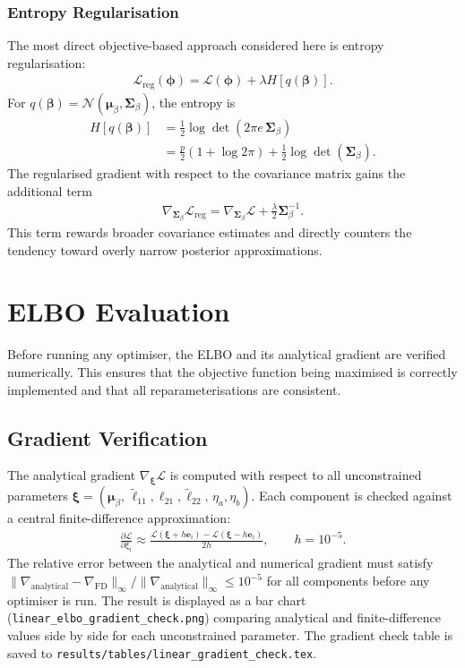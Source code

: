 \documentclass[11pt,a4paper]{article}
\newcommand{\N}{\mathcal{N}}
\begin{document}
\subsubsection{Entropy Regularisation}

The most direct objective-based approach considered here is entropy regularisation:
\begin{align}
\mathcal{L}_{\mathrm{reg}}(\bm{\phi})
= \mathcal{L}(\bm{\phi}) + \lambda H[q(\bm{\beta})].
\end{align}
For $q(\bm{\beta})=\N(\bm{\mu}_\beta,\bm{\Sigma}_\beta)$, the entropy is
\begin{align}
H[q(\bm{\beta})]
&= \frac{1}{2}\log\det(2\pi e\,\bm{\Sigma}_\beta)\\
&= \frac{p}{2}(1+\log 2\pi) + \frac{1}{2}\log\det(\bm{\Sigma}_\beta).
\end{align}
The regularised gradient with respect to the covariance matrix gains the additional term
\begin{align}
\nabla_{\bm{\Sigma}_\beta}\mathcal{L}_{\mathrm{reg}}
= \nabla_{\bm{\Sigma}_\beta}\mathcal{L}
+ \frac{\lambda}{2}\bm{\Sigma}_\beta^{-1}.
\end{align}
This term rewards broader covariance estimates and directly counters the tendency toward overly narrow posterior approximations.
\section{ELBO Evaluation}
\label{sec:elbo-evaluation}

Before running any optimiser, the ELBO and its analytical gradient are verified numerically.
This ensures that the objective function being maximised is correctly implemented and that all
reparameterisations are consistent.

\subsection{Gradient Verification}

The analytical gradient $\nabla_{\bm{\xi}}\mathcal{L}$ is computed with respect to all unconstrained
parameters $\bm{\xi} = (\bm{\mu}_\beta,\, \tilde{\ell}_{11}, \ell_{21}, \tilde{\ell}_{22},\, \eta_a, \eta_b)$.
Each component is checked against a central finite-difference approximation:
\begin{align}
  \frac{\partial \mathcal{L}}{\partial \xi_i} \approx \frac{\mathcal{L}(\bm{\xi} + h\bm{e}_i) - \mathcal{L}(\bm{\xi} - h\bm{e}_i)}{2h}, \qquad h = 10^{-5}.
\end{align}
The relative error between the analytical and numerical gradient must satisfy
$\|\nabla_{\mathrm{analytical}} - \nabla_{\mathrm{FD}}\|_\infty / \|\nabla_{\mathrm{analytical}}\|_\infty \leq 10^{-5}$
for all components before any optimiser is run.
The result is displayed as a bar chart (\texttt{linear\_elbo\_gradient\_check.png}) comparing analytical and
finite-difference values side by side for each unconstrained parameter.
The gradient check table is saved to \texttt{results/tables/linear\_gradient\_check.tex}.
\end{document}
